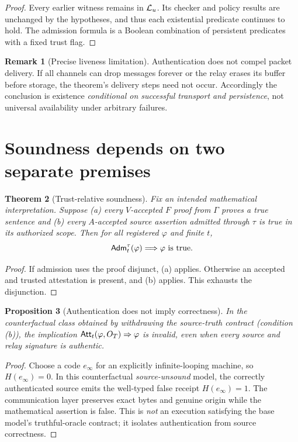 \documentclass[11pt,letterpaper]{article}
\newtheorem{theorem}{Theorem}[section]\newtheorem{lemma}[theorem]{Lemma}\newtheorem{proposition}[theorem]{Proposition}\newtheorem{corollary}[theorem]{Corollary}\theoremstyle{definition}\newtheorem{definition}[theorem]{Definition}\newtheorem{example}[theorem]{Example}\newtheorem{remark}[theorem]{Remark}\newtheorem{conjecture}[theorem]{Conjecture}
\begin{document}
\begin{proof}
Every earlier witness remains in $\mathcal L_u$. Its checker and policy results are unchanged by the hypotheses, and thus each existential predicate continues to hold. The admission formula is a Boolean combination of persistent predicates with a fixed trust flag.
\end{proof}
\begin{remark}[Precise liveness limitation]
Authentication does not compel packet delivery. If all channels can drop messages forever or the relay erases its buffer before storage, the theorem's delivery steps need not occur. Accordingly the conclusion is existence \emph{conditional on successful transport and persistence}, not universal availability under arbitrary failures.
\end{remark}

\section{Soundness depends on two separate premises}
\begin{theorem}[Trust-relative soundness]
Fix an intended mathematical interpretation. Suppose (a) every $V$-accepted $F$ proof from $\Gamma$ proves a true sentence and (b) every $A$-accepted source assertion admitted through $\tau$ is true in its authorized scope. Then for all registered $\varphi$ and finite $t$,
\[\mathsf{Adm}_t^\tau(\varphi)\Longrightarrow \varphi\text{ is true}.\]
\end{theorem}
\begin{proof}
If admission uses the proof disjunct, (a) applies. Otherwise an accepted and trusted attestation is present, and (b) applies. This exhausts the disjunction.
\end{proof}
\begin{proposition}[Authentication does not imply correctness]
In the counterfactual class obtained by withdrawing the source-truth contract (condition (b)), the implication $\mathsf{Att}_t(\varphi,O_T)\Rightarrow \varphi$ is invalid, even when every source and relay signature is authentic.
\end{proposition}
\begin{proof}
Choose a code $e_{\infty}$ for an explicitly infinite-looping machine, so $H(e_{\infty})=0$. In this counterfactual \emph{source-unsound} model, the correctly authenticated source emits the well-typed false receipt $H(e_{\infty})=1$. The communication layer preserves exact bytes and genuine origin while the mathematical assertion is false. This is \emph{not} an execution satisfying the base model's truthful-oracle contract; it isolates authentication from source correctness.
\end{proof}
\end{document}
